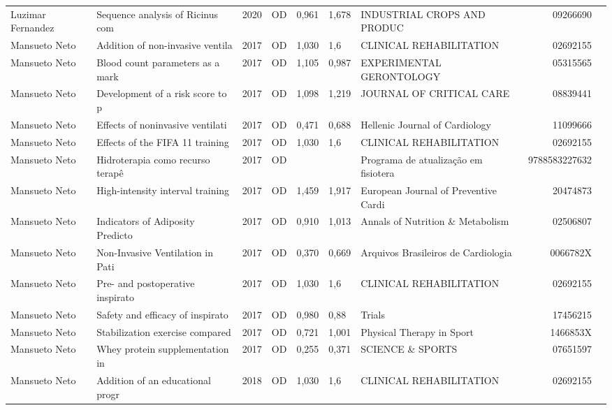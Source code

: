 \documentclass[12pt,brazil]{article}\usepackage[]{graphicx}\usepackage[]{xcolor}
\begin{document}
\begin{longtable}{lllrrllrr}
\rowcolor{coautr}\rowcolor{coautr}\rowcolor{coautr}\rowcolor{coautr}\rowcolor{coautr}\rowcolor{coautr}\rowcolor{coautr}\rowcolor{coautr}\rowcolor{coautr}\rowcolor{coautr}\rowcolor{coautr}\rowcolor{coautr}\rowcolor{coautr}\rowcolor{coautr}\rowcolor{coautr}\rowcolor{coautr}Luzimar Fernandez & Sequence analysis of Ricinus com & 2020 & OD & 0,961 & 1,678 & INDUSTRIAL CROPS AND PRODUC & 09266690 \\
Mansueto Neto & Addition of non-invasive ventila & 2017 & OD & 1,030 & 1,6 & CLINICAL REHABILITATION & 02692155 \\
Mansueto Neto & Blood count parameters as a mark & 2017 & OD & 1,105 & 0,987 & EXPERIMENTAL GERONTOLOGY & 05315565 \\
Mansueto Neto & Development of a risk score to p & 2017 & OD & 1,098 & 1,219 & JOURNAL OF CRITICAL CARE & 08839441 \\
Mansueto Neto & Effects of noninvasive ventilati & 2017 & OD & 0,471 & 0,688 & Hellenic Journal of Cardiology & 11099666 \\
Mansueto Neto & Effects of the FIFA 11 training  & 2017 & OD & 1,030 & 1,6 & CLINICAL REHABILITATION & 02692155 \\
Mansueto Neto & Hidroterapia como recurso terapê & 2017 & OD &  &  & Programa de atualização em fisiotera & 9788583227632 \\
Mansueto Neto & High-intensity interval training & 2017 & OD & 1,459 & 1,917 & European Journal of Preventive Cardi & 20474873 \\
Mansueto Neto & Indicators of Adiposity Predicto & 2017 & OD & 0,910 & 1,013 & Annals of Nutrition \& Metabolism & 02506807 \\
Mansueto Neto & Non-Invasive Ventilation in Pati & 2017 & OD & 0,370 & 0,669 & Arquivos Brasileiros de Cardiologia  & 0066782X \\
Mansueto Neto & Pre- and postoperative inspirato & 2017 & OD & 1,030 & 1,6 & CLINICAL REHABILITATION & 02692155 \\
Mansueto Neto & Safety and efficacy of inspirato & 2017 & OD & 0,980 & 0,88 & Trials & 17456215 \\
Mansueto Neto & Stabilization exercise compared  & 2017 & OD & 0,721 & 1,001 & Physical Therapy in Sport & 1466853X \\
Mansueto Neto & Whey protein supplementation in  & 2017 & OD & 0,255 & 0,371 & SCIENCE \& SPORTS & 07651597 \\
Mansueto Neto & Addition of an educational progr & 2018 & OD & 1,030 & 1,6 & CLINICAL REHABILITATION & 02692155 \\

\end{longtable}
\end{document}
